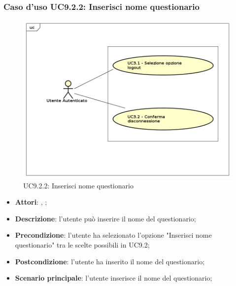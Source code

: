 		\subsubsection{Caso d'uso UC9.2.2: Inserisci nome questionario}
		\label{UC9.2.2}
		\begin{figure}[h]
			\centering
		\includegraphics[scale=0.5,keepaspectratio]{UML/UC9.png}
			\caption{UC9.2.2: Inserisci nome questionario}
		\end{figure}
		\FloatBarrier
		\begin{itemize}
			\item \textbf{Attori}: \uau, \uaupro;
			\item \textbf{Descrizione}: l'utente può inserire il nome del questionario; 
			\item \textbf{Precondizione}: l'utente ha selezionato l'opzione "Inserisci nome questionario" tra le scelte possibili in UC9.2;
			\item \textbf{Postcondizione}: l'utente ha inserito il nome del questionario; 
			\item \textbf{Scenario principale}: l'utente inserisce il nome del questionario;
		\end{itemize}
		
